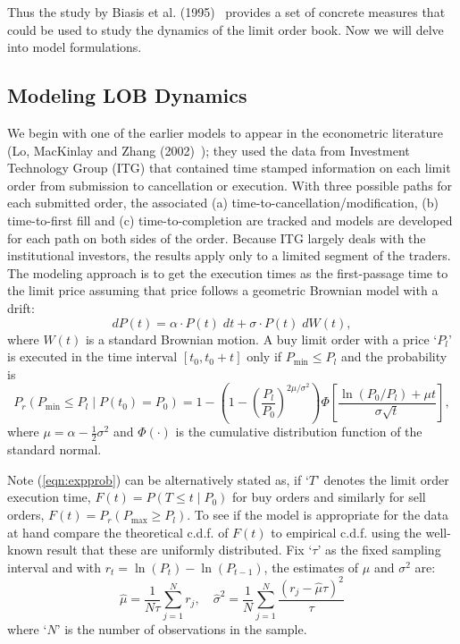 Thus the study by Biasis et al. (1995)~\cite{spalt} provides a set of concrete measures that could be used to study the dynamics of the limit order book. Now we will delve into model formulations. 


\subsection{Modeling LOB Dynamics}

We begin with one of the earlier models to appear in the econometric literature (Lo, MacKinlay and Zhang (2002)~\cite{maczhang}); they used the data from Investment Technology Group (ITG) that contained time stamped information on each limit order from submission to cancellation or execution. With three possible paths for each submitted order, the associated (a) time-to-cancellation/modification, (b) time-to-first fill and (c) time-to-completion are tracked and models are developed for each path on both sides of the order. Because ITG largely deals with the institutional investors, the results apply only to a limited segment of the traders. The modeling approach is to get the execution times as the first-passage time to the limit price assuming that price follows a geometric Brownian model with a drift:
	\begin{equation}\label{eqn:dp(t)}
	dP(t)= \alpha \cdot P(t) \; dt + \sigma \cdot P(t) \; dW(t),
	\end{equation}
where $W(t)$ is a standard Brownian motion. A buy limit order with a price `$P_l$' is executed in the time interval $[t_0,t_0+t]$ only if $P_{\text{min}} \leq P_l$ and the probability is
	\begin{equation}\label{eqn:expprob}
	P_r(P_{\text{min}} \leq P_l \;|\; P(t_0)=P_0)= 1- \left(1 - \left(\dfrac{P_l}{P_0}\right)^{2\mu/\sigma^2}\right) \Phi\left[\dfrac{\ln(P_0/P_l) + \mu t}{\sigma \sqrt{t}}\right],
	\end{equation}
where $\mu=\alpha - \frac{1}{2} \sigma^2$ and $\Phi(\cdot)$ is the cumulative distribution function of the standard normal. 


Note (\ref{eqn:expprob}) can be alternatively stated as, if `$T$' denotes the limit order execution time, $F(t)=P(T \leq t \;|\; P_0)$ for buy orders and similarly for sell orders, $F(t)=P_r(P_{\text{max}} \geq P_l)$. To see if the model is appropriate for the data at hand compare the theoretical c.d.f. of $F(t)$ to empirical c.d.f. using the well-known result that these are uniformly distributed. Fix `$\tau$' as the fixed sampling interval and with $r_t=\ln(P_t)-\ln(P_{t-1})$, the estimates of $\mu$ and $\sigma^2$ are:
	\begin{equation}\label{eqn:sampleestm}
	\hat{\mu}= \dfrac{1}{N\tau} \sum_{j=1}^N r_j, \quad \hat{\sigma}^2= \dfrac{1}{N} \sum_{j=1}^N \dfrac{(r_j - \hat{\mu} \tau)^2}{\tau}
	\end{equation}
where `$N$' is the number of observations in the sample. 


